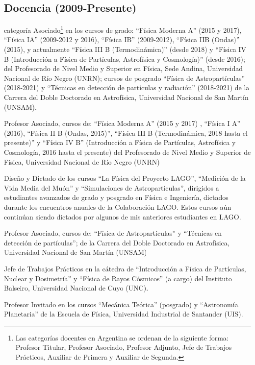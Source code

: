\subsection*{Docencia (2009-Presente)}
\begin{description}
\ifres
	\item [Profesor] categoría Asociado\footnote{Las categorías docentes en Argentina se ordenan de la siguiente forma: Profesor Titular, Profesor Asociado, Profesor Adjunto, Jefe de Trabajos Prácticos, Auxiliar de Primera y Auxiliar de Segunda.} en los cursos de grado: ``Física Moderna A'' (2015 y 2017), ``Física IA'' (2009-2012 y 2016), ``Física IB'' (2009-2012), ``Física IIB (Ondas)'' (2015), y actualmente ``Física III B (Termodinámica)'' (desde 2018) y ``Física IV B (Introducción a Física de Partículas, Astrofísica y Cosmología)'' (desde 2016); del Profesorado de Nivel Medio y Superior en Física, Sede Andina, Universidad Nacional de Río Negro (UNRN); cursos de posgrado ``Física de Astropartículas'' (2018-2021) y ``Técnicas en detección de partículas y radiación'' (2018-2021) de la Carrera del Doble Doctorado en Astrofísica, Universidad Nacional de San Martín (UNSAM).
\else
	\item [2015-presente] Profesor Asociado, cursos de: ``Física Moderna A'' (2015 y 2017) , ``Física I A'' (2016), ``Física II B (Ondas, 2015)'', ``Física III B (Termodinámica, 2018 hasta el presente)'' y ``Física IV B'' (Introducción a Física de Partículas, Astrofísica y Cosmología, 2016 hasta el presente) del Profesorado de Nivel Medio y Superior de Física, Universidad Nacional de Río Negro (UNRN)
	\item [2012-2020] Diseño y Dictado de los cursos ``La Física del Proyecto LAGO'', ``Medición de la Vida Media del Muón'' y ``Simulaciones de Astropartículas'', dirigidos a estudiantes avanzados de grado y posgrado en Física e Ingeniería, dictados durante los encuentros anuales de la Colaboración LAGO. Estos cursos aún continúan siendo dictados por algunos de mis anteriores estudiantes en LAGO\@.
	\item [2018-2021] Profesor Asociado, cursos de: ``Física de Astropartículas'' y ``Técnicas en detección de partículas'';
	de la Carrera del Doble Doctorado en Astrofísica, Universidad Nacional de San Martín (UNSAM)
 	\item [2015-2017] Jefe de Trabajos Prácticos en la cátedra de ``Introducción a Física de Partículas, Nuclear y Dosimetría'' y ``Física de Rayos Cósmicos'' (a cargo) del Instituto Balseiro, Universidad Nacional de Cuyo (UNC).
	\item [2014-2015] Profesor Invitado en los cursos ``Mecánica Teórica'' (posgrado) y ``Astronomía Planetaria'' de la Escuela de Física, Universidad Industrial de Santander (UIS).

\end{description}
